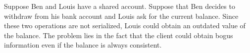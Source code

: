 \documentclass[a4paper,12pt]{article}
\begin{document}
Suppose Ben and Louis have a shared account.  Suppose that Ben decides
to withdraw from his bank account and Louis ask for the current
balance.  Since these two operations are not serialized, Louis could
obtain an outdated value of the balance.  The problem lies in the
fact that the client could obtain bogus information even if the
balance is always consistent.
\end{document}
